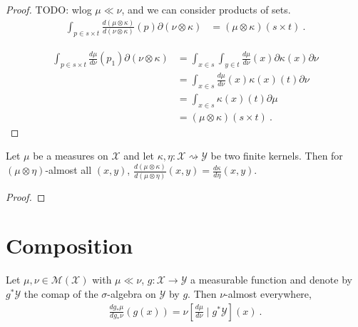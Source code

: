 \begin{proof} \leanok
{}
TODO: wlog $\mu \ll \nu$, and we can consider products of sets.
\begin{align*}
\int_{p \in s \times t} \frac{d (\mu \otimes \kappa)}{d (\nu \otimes \kappa)}(p) \partial(\nu \otimes \kappa)
&= (\mu \otimes \kappa) (s \times t)
\: .
\end{align*}

\begin{align*}
\int_{p \in s \times t} \frac{d \mu}{d \nu}(p_1) \partial(\nu \otimes \kappa)
&= \int_{x \in s} \int_{y \in t} \frac{d \mu}{d \nu}(x) \partial \kappa(x) \partial \nu
\\
&= \int_{x \in s} \frac{d \mu}{d \nu}(x) \kappa(x)(t) \partial \nu
\\
&= \int_{x \in s} \kappa(x)(t) \partial \mu
\\
&= (\mu \otimes \kappa) (s \times t)
\: .
\end{align*}


\end{proof}

\begin{corollary}
  \label{cor:rnDeriv_compProd_right}
  \leanok
  Let $\mu$ be a measures on $\mathcal X$ and let $\kappa, \eta : \mathcal X \rightsquigarrow \mathcal Y$ be two finite kernels. Then for $(\mu \otimes \eta)$-almost all $(x, y)$, $\frac{d (\mu \otimes \kappa)}{d (\mu \otimes \eta)}(x,y) = \frac{d \kappa}{d \eta}(x,y)$.
\end{corollary}

\begin{proof} \leanok
{}
\end{proof}



\section{Composition}


\begin{lemma}
  \label{lem:rnDeriv_map_eq_condexp}
  \uses{}
  Let $\mu, \nu \in \mathcal M(\mathcal X)$ with $\mu \ll \nu$, $g : \mathcal X \to \mathcal Y$ a measurable function and denote by $g^* \mathcal Y$ the comap of the $\sigma$-algebra on $\mathcal Y$ by $g$.
  Then $\nu$-almost everywhere,
  \begin{align*}
  \frac{d g_*\mu}{d g_*\nu}(g(x)) = \nu\left[ \frac{d \mu}{d \nu} \mid g^* \mathcal Y\right](x)
  \: .
  \end{align*}
\end{lemma}

